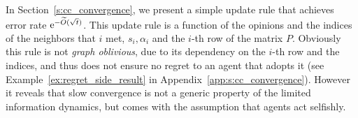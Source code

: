 In Section~\ref{s:cc_convergence}, we present a simple update rule that
achieves error rate $\mathrm{e}^{-\widetilde{O}(\sqrt{t})}$.
This update rule is a function of the opinions and the indices of the neighbors
that $i$ met, $s_i,\alpha_i$ and the $i$-th row of the matrix $P$. Obviously
this rule is not \emph{graph oblivious}, due to its dependency on the $i$-th row
and the indices, 
and thus does not ensure no regret to an agent that adopts it 
(see Example~\ref{ex:regret_side_result} in Appendix~\ref{app:s:cc_convergence}).
However it reveals that slow convergence is not a generic property of 
the limited information dynamics, but comes with the assumption that 
agents act selfishly.
